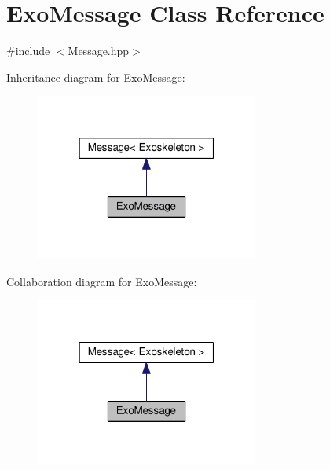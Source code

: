 \hypertarget{classExoMessage}{}\section{Exo\+Message Class Reference}
\label{classExoMessage}


{\ttfamily \#include $<$Message.\+hpp$>$}



Inheritance diagram for Exo\+Message\+:\nopagebreak
\begin{figure}[H]
\begin{center}
\leavevmode
\includegraphics[width=208pt]{classExoMessage__inherit__graph}
\end{center}
\end{figure}


Collaboration diagram for Exo\+Message\+:
\nopagebreak
\begin{figure}[H]
\begin{center}
\leavevmode
\includegraphics[width=208pt]{classExoMessage__coll__graph}
\end{center}
\end{figure}
